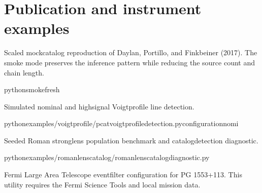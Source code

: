 \documentclass[letterpaper,10pt,english]{sphinxmanual}
\begin{document}
\section{Publication and instrument examples}
\label{\detokenize{examples:publication-and-instrument-examples}}\begin{description}
\sphinxAtStartPar
Scaled mock\sphinxhyphen{}catalog reproduction of Daylan, Portillo, and Finkbeiner (2017).
The smoke mode preserves the inference pattern while reducing the source
count and chain length.

\begin{sphinxVerbatim}[commandchars=\\\{\}]
python\PYGZhy{}\PYGZhy{}smoke\PYGZhy{}\PYGZhy{}fresh
\end{sphinxVerbatim}

\sphinxAtStartPar
Simulated nominal and high\sphinxhyphen{}signal Voigt\sphinxhyphen{}profile line detection.

\begin{sphinxVerbatim}[commandchars=\\\{\}]
pythonexamples/voigt\PYGZhy{}profile/pcat\PYGZus{}voigt\PYGZus{}profile\PYGZus{}detection.py\PYGZhy{}\PYGZhy{}configurationnomi
\end{sphinxVerbatim}

\sphinxAtStartPar
Seeded Roman strong\sphinxhyphen{}lens population benchmark and catalog\sphinxhyphen{}detection
diagnostic.

\begin{sphinxVerbatim}[commandchars=\\\{\}]
pythonexamples/roman\PYGZus{}lens\PYGZus{}catalog/roman\PYGZus{}lens\PYGZus{}catalog\PYGZus{}diagnostic.py
\end{sphinxVerbatim}

\sphinxAtStartPar
Fermi Large Area Telescope event\sphinxhyphen{}filter configuration for PG 1553+113. This
utility requires the Fermi Science Tools and local mission data.

\end{description}
\end{document}
